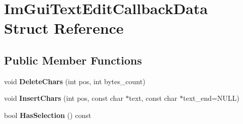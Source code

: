 \hypertarget{struct_im_gui_text_edit_callback_data}{}\section{Im\+Gui\+Text\+Edit\+Callback\+Data Struct Reference}
\label{struct_im_gui_text_edit_callback_data}
\subsection*{Public Member Functions}
\begin{DoxyCompactItemize}
\item 
\mbox{\label{struct_im_gui_text_edit_callback_data_aaa702107677f7da0e7ea61311ab69af0}} 
void {\bfseries Delete\+Chars} (int pos, int bytes\+\_\+count)
\item 
\mbox{\label{struct_im_gui_text_edit_callback_data_a78aa927e57bf5fb898ba5a168e9bcf63}} 
void {\bfseries Insert\+Chars} (int pos, const char $\ast$text, const char $\ast$text\+\_\+end=N\+U\+LL)
\item 
\mbox{\label{struct_im_gui_text_edit_callback_data_ac43cc964e6c1c829db3fdb71660ff604}} 
bool {\bfseries Has\+Selection} () const
\end{DoxyCompactItemize}
